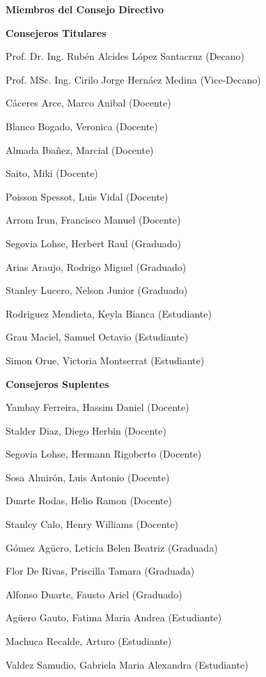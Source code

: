 \begin{center}
\textbf{Miembros del Consejo Directivo}
\end{center}
	\vspace{-5mm}
	
\begin{center}
\textbf{Consejeros Titulares}
\end{center}

Prof. Dr. Ing. Rubén Alcides López Santacruz (Decano)

Prof. MSc. Ing. Cirilo Jorge Hernáez Medina (Vice-Decano)

Cáceres Arce, Marco Anibal (Docente)

Blanco Bogado, Veronica (Docente)

Almada Ibañez, Marcial (Docente)

Saito, Miki (Docente)

Poisson Spessot, Luis Vidal (Docente)

Arrom Irun, Francisco Manuel (Docente)

Segovia Lohse, Herbert Raul (Graduado)

Arias Araujo, Rodrigo Miguel (Graduado)

Stanley Lucero, Nelson Junior (Graduado)

Rodriguez Mendieta, Keyla Bianca (Estudiante)

Grau Maciel, Samuel Octavio (Estudiante)

Simon Orue, Victoria Montserrat (Estudiante)
	
	\vspace{5mm}
	
 
 \begin{center}
	\textbf{Consejeros Suplentes }
 \end{center}
	
 Yambay Ferreira, Hassim Daniel (Docente)

 Stalder Diaz, Diego Herbin (Docente)

 Segovia Lohse, Hermann Rigoberto (Docente)

 Sosa Almirón, Luis Antonio (Docente)

 Duarte Rodas, Helio Ramon (Docente)

 Stanley Calo, Henry Williams (Docente)

 Gómez Agüero, Leticia Belen Beatriz (Graduada)

 Flor De Rivas, Priscilla Tamara (Graduada)

 Alfonso Duarte, Fausto Ariel (Graduado)

 Agüero Gauto, Fatima Maria Andrea (Estudiante)

 Machuca Recalde, Arturo (Estudiante)
 
 Valdez Samudio, Gabriela Maria Alexandra (Estudiante)

	
